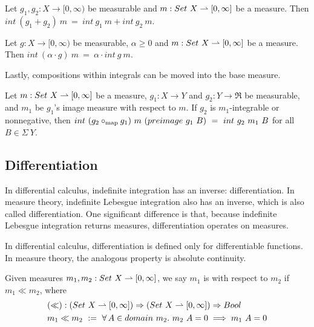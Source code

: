 \begin{lemma}
\label{lem:int-distributes-over-addition}
Let $g_1,g_2 : X \to [0,\infty)$ be measurable and $m : Set~X \rightharpoonup [0,\infty]$ be a measure.
Then $int~(g_1 + g_2)~m\ =\ int~g_1~m + int~g_2~m$.
\end{lemma}

\begin{lemma}
\label{lem:int-distributes-over-scaling}
Let $g : X \to [0,\infty)$ be measurable, $\alpha \ge 0$ and $m : Set~X \rightharpoonup [0,\infty]$ be a measure.
Then $int~(\alpha \cdot g)~m\ =\ \alpha \cdot int~g~m$.
\end{lemma}

Lastly, compositions within integrals can be moved into the base measure.

\begin{lemma}
\label{lem:int-image-measure}
Let $m : Set~X \rightharpoonup [0,\infty]$ be a measure, $g_1 : X \to Y$ and $g_2 : Y \to \Re$ be measurable, and $m_1$ be $g_1$'s image measure with respect to $m$.
If $g_2$ is $m_1$-integrable or nonnegative, then $int~(g_2 \circ_\mathrm{map} g_1)~m~(preimage~g_1~B)\ =\ int~g_2~m_1~B$ for all $B \in \Sigma~Y$.
\end{lemma}

\begin{comment}
XXX: how I really want the preceeding statement:
\begin{equation}
	(int~(g_2 \circ\map g_1)~m) \circ\map (preimage_{map}~g_1)\ =\ int~g_2~(m \circ\map (preimage_{map}~g_1))
\end{equation}
\end{comment}

\subsection{Differentiation}
 
In differential calculus, indefinite integration has an inverse: differentiation.
In measure theory, indefinite Lebesgue integration also has an inverse, which is also called differentiation.
One significant difference is that, because indefinite Lebesgue integration returns measures, differentiation operates on measures.

In differential calculus, differentiation is defined only for differentiable functions.
In measure theory, the analogous property is absolute continuity.

\begin{definition}
\label{def:absolute-continuity}
Given measures $m_1,m_2 : Set~X \rightharpoonup [0,\infty]$, we say $m_1$ is  with respect to $m_2$ if $m_1 \ll m_2$, where
\begin{equation}
\begin{aligned}
	&(\ll) : (Set~X \rightharpoonup [0,\infty]) \Rightarrow (Set~X \rightharpoonup [0,\infty]) \Rightarrow Bool \\
	&m_1 \ll m_2\ :=\ \forall\,{A \in domain~m_2}\ldotp\, m_2~A = 0 \implies m_1~A = 0
\end{aligned}
\end{equation}
\end{definition}

